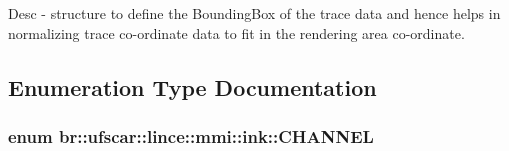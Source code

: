 Desc -\/ structure to define the BoundingBox of the trace data and hence helps in normalizing trace co-\/ordinate data to fit in the rendering area co-\/ordinate. 



\subsection{Enumeration Type Documentation}
\hypertarget{namespacebr_1_1ufscar_1_1lince_1_1mmi_1_1ink_a857f7b80c5d28f256c70d78cacf91dab}{
\subsubsection[{CHANNEL}]{\setlength{\rightskip}{0pt plus 5cm}enum {\bf br::ufscar::lince::mmi::ink::CHANNEL}}}
\label{namespacebr_1_1ufscar_1_1lince_1_1mmi_1_1ink_a857f7b80c5d28f256c70d78cacf91dab}
